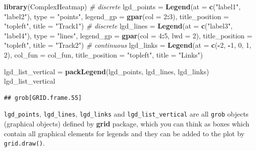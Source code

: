 \documentclass[]{book}
\newenvironment{Shaded}{\begin{snugshade}}{\end{snugshade}}
\newcommand{\KeywordTok}[1]{\textcolor[rgb]{0.13,0.29,0.53}{\textbf{#1}}}
\newcommand{\DataTypeTok}[1]{\textcolor[rgb]{0.13,0.29,0.53}{#1}}
\newcommand{\DecValTok}[1]{\textcolor[rgb]{0.00,0.00,0.81}{#1}}
\newcommand{\StringTok}[1]{\textcolor[rgb]{0.31,0.60,0.02}{#1}}
\newcommand{\CommentTok}[1]{\textcolor[rgb]{0.56,0.35,0.01}{\textit{#1}}}
\newcommand{\OperatorTok}[1]{\textcolor[rgb]{0.81,0.36,0.00}{\textbf{#1}}}
\newcommand{\NormalTok}[1]{#1}
\theoremstyle{definition}
\theoremstyle{definition}
\theoremstyle{remark}
\begin{document}
\begin{Shaded}
\begin{Highlighting}[]
\KeywordTok{library}\NormalTok{(ComplexHeatmap)}
\CommentTok{# discrete}
\NormalTok{lgd_points =}\StringTok{ }\KeywordTok{Legend}\NormalTok{(}\DataTypeTok{at =} \KeywordTok{c}\NormalTok{(}\StringTok{"label1"}\NormalTok{, }\StringTok{"label2"}\NormalTok{), }\DataTypeTok{type =} \StringTok{"points"}\NormalTok{, }
    \DataTypeTok{legend_gp =} \KeywordTok{gpar}\NormalTok{(}\DataTypeTok{col =} \DecValTok{2}\OperatorTok{:}\DecValTok{3}\NormalTok{), }\DataTypeTok{title_position =} \StringTok{"topleft"}\NormalTok{, }
    \DataTypeTok{title =} \StringTok{"Track1"}\NormalTok{)}
\CommentTok{# discrete}
\NormalTok{lgd_lines =}\StringTok{ }\KeywordTok{Legend}\NormalTok{(}\DataTypeTok{at =} \KeywordTok{c}\NormalTok{(}\StringTok{"label3"}\NormalTok{, }\StringTok{"label4"}\NormalTok{), }\DataTypeTok{type =} \StringTok{"lines"}\NormalTok{, }
    \DataTypeTok{legend_gp =} \KeywordTok{gpar}\NormalTok{(}\DataTypeTok{col =} \DecValTok{4}\OperatorTok{:}\DecValTok{5}\NormalTok{, }\DataTypeTok{lwd =} \DecValTok{2}\NormalTok{), }\DataTypeTok{title_position =} \StringTok{"topleft"}\NormalTok{, }
    \DataTypeTok{title =} \StringTok{"Track2"}\NormalTok{)}
\CommentTok{# continuous}
\NormalTok{lgd_links =}\StringTok{ }\KeywordTok{Legend}\NormalTok{(}\DataTypeTok{at =} \KeywordTok{c}\NormalTok{(}\OperatorTok{-}\DecValTok{2}\NormalTok{, }\OperatorTok{-}\DecValTok{1}\NormalTok{, }\DecValTok{0}\NormalTok{, }\DecValTok{1}\NormalTok{, }\DecValTok{2}\NormalTok{), }\DataTypeTok{col_fun =}\NormalTok{ col_fun, }
    \DataTypeTok{title_position =} \StringTok{"topleft"}\NormalTok{, }\DataTypeTok{title =} \StringTok{"Links"}\NormalTok{)}

\NormalTok{lgd_list_vertical =}\StringTok{ }\KeywordTok{packLegend}\NormalTok{(lgd_points, lgd_lines, lgd_links)}
\NormalTok{lgd_list_vertical}
\end{Highlighting}
\end{Shaded}

\begin{verbatim}
## grob[GRID.frame.55]
\end{verbatim}

\texttt{lgd\_points}, \texttt{lgd\_lines}, \texttt{lgd\_links} and
\texttt{lgd\_list\_vertical} are all \texttt{grob} objects (graphical
objects) defined by \textbf{grid} package, which you can think as boxes
which contain all graphical elements for legends and they can be added
to the plot by \texttt{grid.draw()}.
\end{document}
